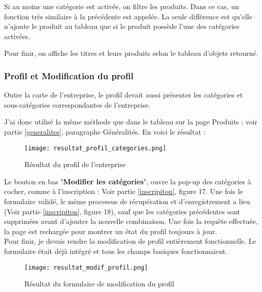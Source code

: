 Si au moins une catégorie est activée, on filtre les produits. Dans ce cas, un fonction très similaire à la précédente est appelée. La seule différence est qu'elle n'ajoute le produit au tableau que si le produit possède l'une des catégories activées.

Pour finir, on affiche les titres et leurs produits selon le tableau d'objets retourné.


\subsubsection{Profil et Modification du profil}


Outre la carte de l'entreprise, le profil devait aussi présenter les catégories et sous-catégories correspondantes de l'entreprise.

J'ai donc utilisé la même méthode que dans le tableau sur la page Produits : voir partie \ref{generalites}, paragraphe Généralités. En voici le résultat :

\begin{figure}[H]
    \texttt{[image: resultat\_profil\_categories.png]}
    \caption{Résultat du profil de l'entreprise}
\end{figure}


Le bouton en bas "\textbf{Modifier les catégories}", ouvre la pop-up des catégories à cocher, comme à l'inscription : Voir partie \ref{inscripiton}, figure 17.
Une fois le formulaire validé, le même processus de récupération et d'enregistrement a lieu (Voir partie \ref{inscripiton}, figure 18), sauf que les catégories précédentes sont supprimées avant d'ajouter la nouvelle combinaison.
Une fois la requête effectuée, la page est rechargée pour montrer un état du profil toujours à jour.\\


Pour finir, je devais rendre la modification de profil entièrement fonctionnelle. Le formulaire était déjà intégré et tous les champs basiques fonctionnaient.

\begin{figure}[H]
    \texttt{[image: resultat\_modif\_profil.png]}
    \caption{Résultat du formulaire de modification du profil}
\end{figure}

